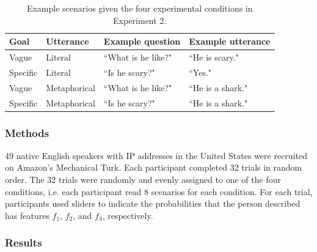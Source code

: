 \documentclass[10pt,letterpaper]{article}
\begin{document}
\begin{table}[h]
\tabcolsep=0.2cm
\small
\begin{tabular}{llll}
\toprule
Goal & Utterance & Example question & Example utterance \\
\midrule
Vague & Literal & ``What is he like?" & ``He is scary." \\
Specific  & Literal & ``Is he scary?" & ``Yes." \\
Vague & Metaphorical & ``What is he like?" & ``He is a shark." \\
Specific & Metaphorical & ``Is he scary?" & ``He is a shark." \\
\bottomrule
\end{tabular}
\caption{Example scenarios given the four experimental conditions in Experiment 2.}
\end{table}

\subsubsection{Methods}
$49$ native English speakers with IP addresses in the United States were recruited on Amazon's Mechanical Turk. Each participant completed $32$ trials in random order. The $32$ trials were randomly and evenly assigned to one of the four conditions, i.e. each participant read $8$ scenarios for each condition. For each trial, participants used sliders to indicate the probabilities that the person described has features $f_1$, $f_2$, and $f_3$, respectively.



\subsubsection{Results}
\end{document}
